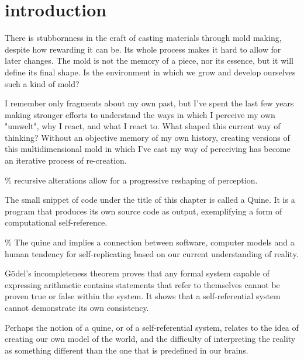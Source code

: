 \chapter*{introduction}
\begin{center}
\vspace{2cm}
\begin{flushright}
\footnotesize 

\end{flushright}
\vspace{2cm}
\end{center}
\normalsize

\newpage  %
There is stubbornness in the craft of casting materials through mold making, despite how rewarding it can be. Its whole process makes it hard to allow for later changes. The mold is not the memory of a piece, nor its essence, but it will define its final shape. Is the environment in which we grow and develop ourselves such a kind of mold? 

I remember only fragments about my own past, but I've spent the last few years making stronger efforts to understand the ways in which I perceive my own "umwelt", why I react, and what I react to.  What shaped this current way of thinking? Without an objective memory of my own history, creating versions of this multidimensional mold in which I've cast my way of perceiving has become an iterative process of re-creation.

{\scriptsize \textcolor{comment}{\% recursive alterations allow for a progressive reshaping of perception. }}

The small snippet of code under the title of this chapter is called a Quine. It is a program that produces its own source code as output, exemplifying a form of computational self-reference. 

{\scriptsize \textcolor{comment}{\% The quine and implies a connection between software, computer models and a human tendency for self-replicating based on our current understanding of reality.}}

Gödel's incompleteness theorem proves that any formal system capable of expressing arithmetic contains statements that refer to themselves cannot be proven true or false within the system. It shows that a self-referential system cannot demonstrate its own consistency.

Perhaps the notion of a quine, or of a self-referential system, relates to the idea of creating our own model of the world, and the difficulty of interpreting the reality as something different than the one that is predefined in our brains. 


